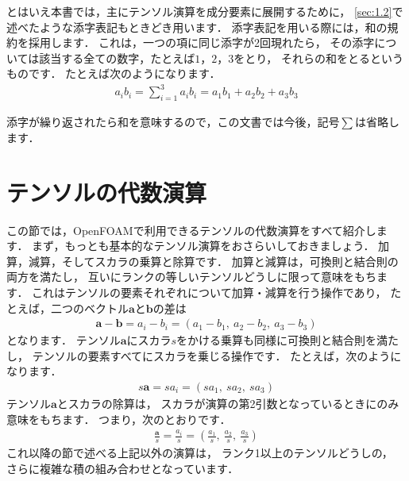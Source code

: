 とはいえ本書では，主にテンソル演算を成分要素に展開するために，
\autoref{sec:1.2}で述べたような添字表記もときどき用います．
添字表記を用いる際には，和の規約を採用します．
これは，一つの項に同じ添字が2回現れたら，
その添字については該当する全ての数字，たとえば$1$，$2$，$3$をとり，
それらの和をとるというものです．
たとえば次のようになります．
\begin{align}
 \label{eq:1.3}
 a_{i}b_{i} = \sum^{3}_{i=1}a_{i}b_{i} = a_{1}b_{1} + a_{2}b_{2} + a_{3}b_{3}
\end{align}

添字が繰り返されたら和を意味するので，この文書では今後，記号$\sum$は省略します．



\section{テンソルの代数演算}
\label{sec:1.3}
この節では，OpenFOAMで利用できるテンソルの代数演算をすべて紹介します．
まず，もっとも基本的なテンソル演算をおさらいしておきましょう．
加算，減算，そしてスカラの乗算と除算です．
加算と減算は，可換則と結合則の両方を満たし，
互いにランクの等しいテンソルどうしに限って意味をもちます．
これはテンソルの要素それぞれについて加算・減算を行う操作であり，
たとえば，二つのベクトル$\bm{a}$と$\bm{b}$の差は
\begin{align}
 \label{eq:1.4}
 \bm{a} - \bm{b} = a_{i} - b_{i} = (a_{1} - b_{1},\ a_{2} - b_{2},\ a_{3} - b_{3})
\end{align}
となります．
テンソル$\bm{a}$にスカラ$s$をかける乗算も同様に可換則と結合則を満たし，
テンソルの要素すべてにスカラを乗じる操作です．
たとえば，次のようになります．
\begin{align}
 \label{eq:1.5}
 s\bm{a} = sa_{i} = (sa_{1},\ sa_{2},\ sa_{3})
\end{align}
テンソル$\bm{a}$とスカラの除算は，
スカラが演算の第2引数となっているときにのみ意味をもちます．
つまり，次のとおりです．
\begin{align}
 \label{eq:1.6}
 \frac{\bm{a}}{s} = \frac{a_{i}}{s}
 = \left(\frac{a_{1}}{s},\ \frac{a_{2}}{s},\ \frac{a_{3}}{s}\right)
\end{align}
これ以降の節で述べる上記以外の演算は，
ランク1以上のテンソルどうしの，
さらに複雑な積の組み合わせとなっています．


